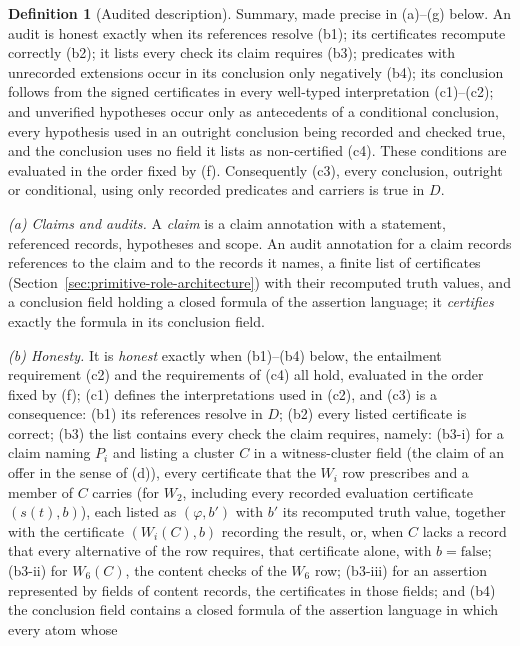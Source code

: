 \documentclass[11pt]{article}
\theoremstyle{definition}
\newtheorem{definition}[theorem]{Definition}
\begin{document}
\begin{definition}[Audited description]\label{def:audited}
Summary, made precise in (a)--(g) below. An audit is honest exactly when its
references resolve (b1); its certificates recompute correctly (b2); it lists
every check its claim requires (b3); predicates with unrecorded extensions
occur in its conclusion only negatively (b4); its conclusion follows from the
signed certificates in every well-typed interpretation (c1)--(c2); and
unverified hypotheses occur only as antecedents of a conditional conclusion,
every hypothesis used in an outright conclusion being recorded and checked
true, and the conclusion uses no field it lists as non-certified (c4). These
conditions are evaluated in the order fixed by (f). Consequently (c3), every conclusion, outright or conditional, using only recorded predicates and carriers is true in
\(D\).
\par \emph{(a) Claims and audits.} A \emph{claim} is a claim annotation with a statement, referenced records,
hypotheses and scope. An audit annotation for a claim records references to
the claim and to the records it names, a finite list of certificates
(Section~\ref{sec:primitive-role-architecture}) with their recomputed truth
values, and a conclusion field holding a closed formula of the assertion language;
it \emph{certifies} exactly the formula in its conclusion field. \par\emph{(b) Honesty.} It is
\emph{honest} exactly when (b1)--(b4) below, the entailment requirement (c2)
and the requirements of (c4) all hold, evaluated in the order fixed by (f);
(c1) defines the interpretations used in (c2), and (c3) is a consequence:
(b1) its references resolve in \(D\); (b2) every listed
certificate is correct; (b3) the list contains every check the claim requires,
namely: (b3-i) for a claim naming \(P_i\) and listing a cluster \(C\) in a
witness-cluster field (the claim of an offer in the sense of (d)), every certificate that the \(W_i\) row prescribes and a member of \(C\) carries (for \(W_2\), including every recorded evaluation certificate \((s(t),b)\)), each listed as \((\varphi,b')\) with \(b'\) its recomputed truth value, together with the certificate \((W_i(C),b)\) recording
the result, or, when \(C\) lacks a record that every alternative of the row requires, that certificate
alone, with \(b=\mathrm{false}\); (b3-ii) for \(W_6(C)\), the content checks of the
\(W_6\) row; (b3-iii) for an assertion represented by fields of content records, the
certificates in those fields; and (b4) the conclusion field contains a closed formula of the assertion language in which every atom whose

\end{definition}
\end{document}
